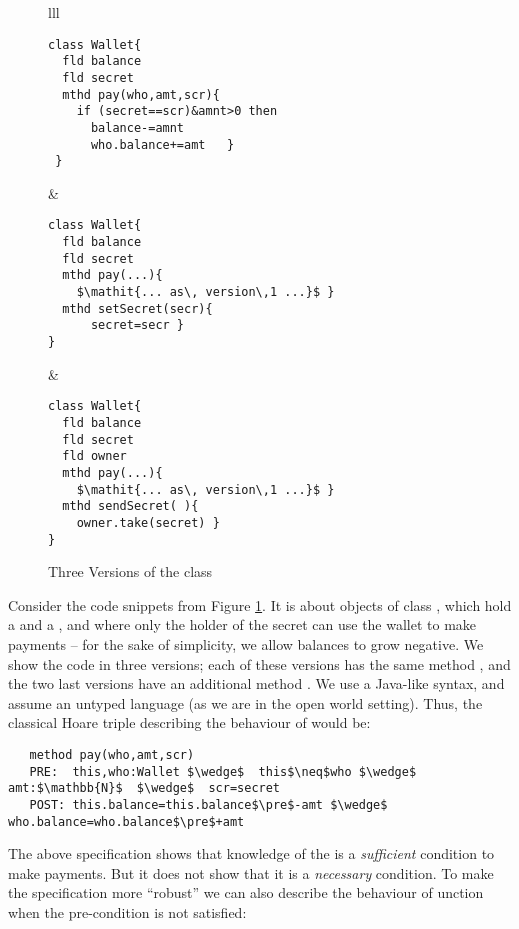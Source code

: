 \documentclass[acmsmall,screen]{acmart}
\begin{document}
 \begin{figure}[htb]
 \begin{tabular}{lll}
\begin{minipage}{0.39\textwidth}
\begin{lstlisting}
class Wallet{
  fld balance 
  fld secret 
  mthd pay(who,amt,scr){
    if (secret==scr)&amnt>0 then 
      balance-=amnt
      who.balance+=amt   }
 }
\end{lstlisting}
\end{minipage}
  & 
\begin{minipage}{0.29\textwidth}
\begin{lstlisting}
class Wallet{
  fld balance  
  fld secret  
  mthd pay(...){
    $\mathit{... as\, version\,1 ...}$ }
  mthd setSecret(secr){
      secret=secr }
}
\end{lstlisting}
\end{minipage} &  
\begin{minipage}{0.32\textwidth}
\begin{lstlisting}
class Wallet{
  fld balance  
  fld secret  
  fld owner  
  mthd pay(...){
    $\mathit{... as\, version\,1 ...}$ }
  mthd sendSecret( ){
    owner.take(secret) }  
}
\end{lstlisting}
  \end{minipage}
 \end{tabular}
  \vspace*{-0.95cm}
  \caption{Three Versions of the class }
 \label{fig:Example}
 \end{figure}

Consider the code snippets from Figure \ref{fig:Example}. It is about objects of
 class , which hold a  and a , and where only the holder of the secret can use the wallet to
 make payments
 -- for the sake of simplicity, we allow   balances to grow negative.
 We show the code in three versions; each of these versions has the same method , and the two last versions
 have an additional method .
  We use a Java-like syntax, and assume an untyped language (as we are in the open world setting).
 Thus, the classical Hoare triple describing the behaviour of  would be:
 
\begin{lstlisting}
   method pay(who,amt,scr)
   PRE:  this,who:Wallet $\wedge$  this$\neq$who $\wedge$ amt:$\mathbb{N}$  $\wedge$  scr=secret   
   POST: this.balance=this.balance$\pre$-amt $\wedge$ who.balance=who.balance$\pre$+amt 
 \end{lstlisting}
\vspace{-.2in}
The above specification shows that knowledge of the  is a \emph{sufficient} condition to make payments. 
But it does not show that it is a \emph{necessary} condition. To make the specification  
  more ``robust'' we can also describe the behaviour of  unction  when the pre-condition is not satisfied:
\end{document}

